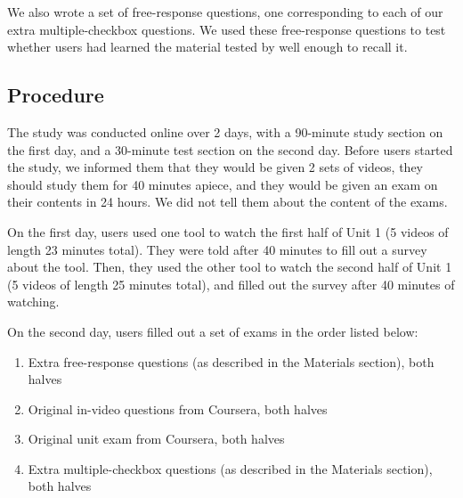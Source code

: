 \documentclass{chi-ext}
\begin{document}
We also wrote a set of free-response questions, one corresponding to each of our extra multiple-checkbox questions. We used these free-response questions to test whether users had learned the material tested by well enough to recall it.


\subsection{Procedure}

The study was conducted online over 2 days, with a 90-minute study section on the first day, and a 30-minute test section on the second day. Before users started the study, we informed them that they would be given 2 sets of videos, they should study them for 40 minutes apiece, and they would be given an exam on their contents in 24 hours. We did not tell them about the content of the exams.

On the first day, users used one tool to watch the first half of Unit 1 (5 videos of length 23 minutes total). They were told after 40 minutes to fill out a survey about the tool. Then, they used the other tool to watch the second half of Unit 1 (5 videos of length 25 minutes total), and filled out the survey after 40 minutes of watching.

On the second day, users filled out a set of exams in the order listed below:

\begin{enumerate}
\item Extra free-response questions (as described in the Materials section), both halves
\item Original in-video questions from Coursera, both halves
\item Original unit exam from Coursera, both halves
\item Extra multiple-checkbox questions (as described in the Materials section), both halves
\end{enumerate}
\end{document}

